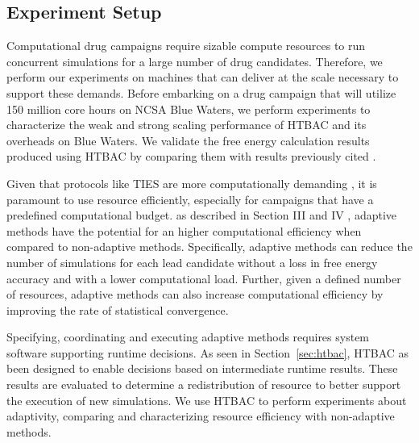 \subsection{Experiment Setup}\label{ssec:exp_design}

Computational drug campaigns require sizable compute resources %
to run concurrent simulations for a large number of drug candidates.
Therefore, we perform our experiments on machines that can deliver at the
scale necessary to support these demands. 
Before embarking on a drug campaign that will utilize 150 million core hours
on NCSA Blue Waters, we perform experiments to characterize the weak and
strong scaling performance of HTBAC and its overheads on Blue Waters. We
validate the free energy calculation results produced using HTBAC by
comparing them with results previously cited 
.

Given that protocols like TIES are more computationally demanding
, it is paramount to use resource efficiently,
especially for campaigns that have a predefined computational budget. as
described in Section III and IV
, adaptive methods  have the potential for an higher computational
efficiency when compared to non-adaptive methods. Specifically, adaptive
methods can reduce the number of simulations for each lead candidate without
a loss in free energy accuracy and with a lower computational load. Further,
given a defined number of resources, adaptive methods can also increase
computational efficiency by improving the rate of statistical convergence.

Specifying, coordinating and executing adaptive  methods
requires system software supporting runtime decisions. As seen in
Section~\ref{sec:htbac}, HTBAC as been designed to enable decisions based on
intermediate runtime results. These results are evaluated to determine a
redistribution of resource to better support the execution of new
simulations. We use HTBAC to perform experiments about adaptivity, comparing
and characterizing resource efficiency with non-adaptive 
methods.  

